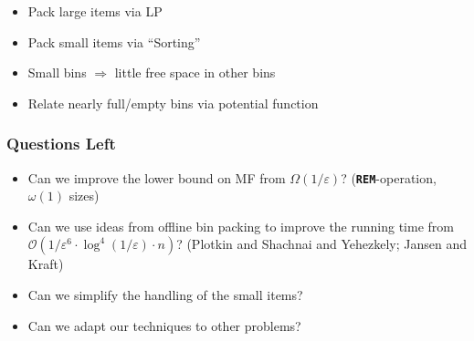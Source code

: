 \documentclass[german,table]{beamer}
\def\itempadding{1.5pt}
\newcommand{\addToBin}[8]{
  \begin{scope}[x= 1cm, y=4cm, rounded corners=2pt]
  \onslide<#7-#8>{
       \draw [#5] 
       ($(#1,#2)+(\itempadding,\itempadding)$) 
       rectangle node (#6) {#4} 
       ($(#1,#2)+(-\itempadding,-\itempadding)+(1,#3)$);

}
\end{scope}
}
\newcommand{\myOperationName}[1]{\texttt{\textbf{#1}}}
\begin{document}
\begin{frame}
\begin{center}
  \begin{itemize}[<+-|alert@+>]
  \item Pack large items via LP
  \item Pack small items via ``Sorting''
  \item Small bins $\Rightarrow$ little free space in other bins
  \item Relate nearly full/empty bins via potential function
  \end{itemize}
  \end{center}
\end{frame}



\begin{frame}
  \frametitle{Questions Left}
  \begin{itemize}[<+-|alert@+>]
  \item Can we improve the lower bound on MF from
    $\Omega(1/\varepsilon)$? (\myOperationName{REM}-operation, $\omega(1)$ sizes)

  \item Can we use ideas from offline bin packing to improve the running
    time from
    $\mathcal{O}(1/\varepsilon^{6}\cdot \log^{4}(1/\varepsilon)\cdot n)$?
    (Plotkin and Shachnai and Yehezkely; Jansen and Kraft)
  \item Can we simplify the handling of the small items?
  \item Can we adapt our techniques to other problems?
  \end{itemize}
  
\end{frame}
\end{document}
